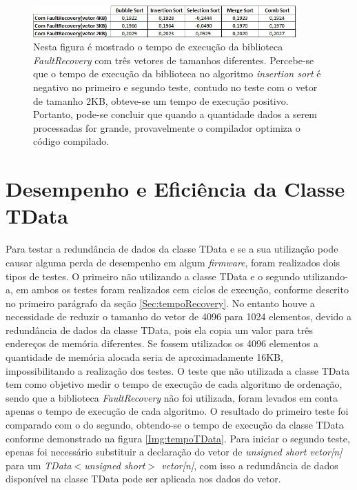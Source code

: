 \begin{figure}[h]
	\centering
	\includegraphics[width=0.9\textwidth]{figuras/tempoRecovery2.jpg}
	\caption[Tempo de execução da biblioteca \textit{FaultRecovery} com três tamanhos de vetores diferentes.]{Nesta figura é mostrado o tempo de execução da biblioteca \textit{FaultRecovery} com três vetores de tamanhos diferentes. Percebe-se que o tempo de execução da biblioteca no algoritmo \textit{insertion sort} é negativo no primeiro e segundo teste, contudo no teste com o vetor de tamanho 2KB, obteve-se um tempo de execução positivo. Portanto, pode-se concluir que quando a quantidade dados a serem processadas for grande, provavelmente o compilador optimiza o código compilado.}
	\label{Img:tempoRecovery2}	
\end{figure}
\newpage
\section{Desempenho e Eficiência da Classe TData} \label{Sec:tempoTData}

Para testar a redundância de dados da classe TData e se a sua utilização pode causar alguma perda de desempenho em algum \textit{firmware}, foram realizados dois tipos de testes. O primeiro não utilizando a classe TData e o segundo utilizando-a, em ambos os testes foram realizados cem ciclos de execução, conforme descrito no primeiro parágrafo da seção \ref{Sec:tempoRecovery}. No entanto houve a necessidade de reduzir o tamanho do vetor de 4096 para 1024 elementos, devido a redundância de dados da classe TData, pois ela copia um valor para três endereços de memória diferentes. Se fossem utilizados os 4096 elementos a quantidade de memória alocada seria de aproximadamente 16KB, impossibilitando a realização dos testes. O teste que não utilizada a classe TData tem como objetivo medir o tempo de execução de cada algoritmo de ordenação, sendo que a biblioteca \textit{FaultRecovery} não foi utilizada, foram levados em conta apenas o tempo de execução de cada algoritmo. O resultado do primeiro teste foi comparado com o do segundo, obtendo-se o tempo de execução da classe TData conforme demonstrado na figura \ref{Img:tempoTData}. Para iniciar o segundo teste, epenas foi necessário substituir a declaração do vetor de \textit{unsigned short vetor[n]} para um \textit{TData$<$unsigned short$>$ vetor[n]}, com isso a redundância de dados disponível na classe TData pode ser aplicada nos dados do vetor.

